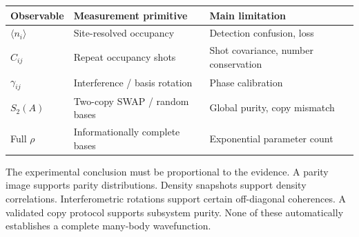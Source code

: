 \documentclass[11pt,a4paper]{article}
\begin{document}
\begin{center}\small
\begin{tabularx}{\linewidth}{@{}p{3.2cm}X X@{}}\toprule
Observable & Measurement primitive & Main limitation \\ \midrule
$\langle n_i\rangle$ & Site-resolved occupancy & Detection confusion, loss \\
$C_{ij}$ & Repeat occupancy shots & Shot covariance, number conservation \\
$\gamma_{ij}$ & Interference / basis rotation & Phase calibration \\
$S_2(A)$ & Two-copy SWAP / random bases & Global purity, copy mismatch \\
Full $\rho$ & Informationally complete bases & Exponential parameter count \\
\bottomrule
\end{tabularx}
\end{center}
The experimental conclusion must be proportional to the evidence. A parity image supports parity distributions. Density snapshots support density correlations. Interferometric rotations support certain off-diagonal coherences. A validated copy protocol supports subsystem purity. None of these automatically establishes a complete many-body wavefunction.
\end{document}
